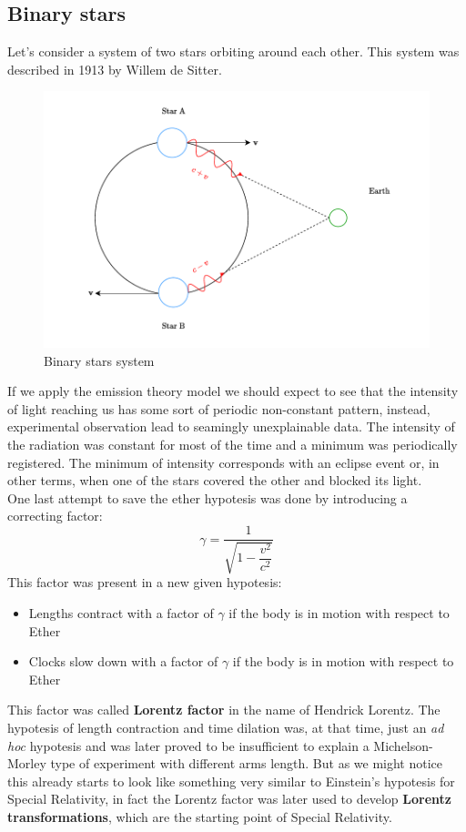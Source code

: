 \subsection{Binary stars}
Let's consider a system of two stars orbiting around each other. This system was described in 1913 by  Willem de Sitter.
\begin{figure}[H]
  \centering
  \includegraphics[width=0.6\linewidth]{res/svg/binary_stars.drawio}
  \caption{Binary stars system}
\end{figure}
If we apply the emission theory model we should expect to see that the intensity of light reaching us has some sort of periodic non-constant pattern, instead, experimental observation lead to seamingly unexplainable data. The intensity of the radiation was constant for most of the time and a minimum was periodically registered. The minimum of intensity corresponds with an eclipse event or, in other terms, when one of the stars covered the other and blocked its light.\\
One last attempt to save the ether hypotesis was done by introducing a correcting factor:
\begin{equation}
  \gamma = \dfrac{1}{\sqrt{1-\dfrac{v^2}{c^2}}}
\end{equation}
This factor was present in a new given hypotesis:
\begin{itemize}
  \item Lengths contract with a factor of $\gamma$ if the body is in motion with respect to Ether
  \item Clocks slow down with a factor of $\gamma$ if the body is in motion with respect to Ether
\end{itemize}
This factor was called \textbf{Lorentz factor} in the name of Hendrick Lorentz. The hypotesis of length contraction and time dilation was, at that time, just an \textit{ad hoc} hypotesis and was later proved to be insufficient to explain a Michelson-Morley type of experiment with different arms length. But as we might notice this already starts to look like something very similar to Einstein's hypotesis for Special Relativity, in fact the Lorentz factor was later used to develop \textbf{Lorentz transformations}, which are the starting point of Special Relativity.

